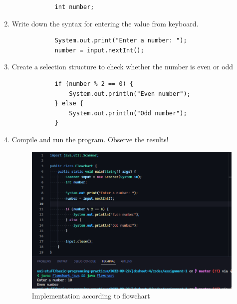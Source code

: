 \documentclass[12pt,titlepage]{article}
\begin{document}
\begin{enumerate}
{        \begin{verbatim}
            int number;
        \end{verbatim}
    }
    \item {
        Write down the syntax for entering the value from keyboard.

        \begin{verbatim}
            System.out.print("Enter a number: ");
            number = input.nextInt();
        \end{verbatim}
    }
    \item {
        Create a selection structure to check whether the number is even or odd

        \begin{verbatim}
            if (number % 2 == 0) {
                System.out.println("Even number");
            } else {
                System.out.println("Odd number");
            }
        \end{verbatim}
    }
    \item {
        Compile and run the program. Observe the results!

        \begin{figure}[h]
            \centering
            \includegraphics[width=.8\textwidth]{./images/flowchart-impl.png}
            \caption{Implementation according to flowchart}
        \end{figure}
    }
    \pagebreak
\end{enumerate}
\end{document}
